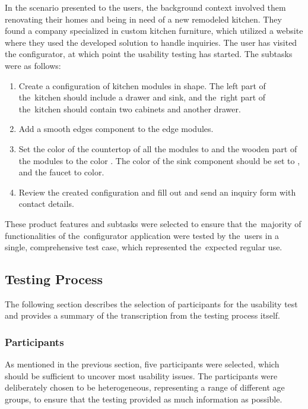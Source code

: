 In the scenario presented to the users, the background context involved them renovating their homes and being in need of a new remodeled kitchen. They found a company specialized in custom kitchen furniture, which utilized a website where they used the developed solution to handle inquiries. The user has visited the configurator, at which point the usability testing has started. The subtasks were as follows:
\begin{enumerate}
    \item Create a configuration of kitchen modules in  shape. The left part of the~kitchen should include a drawer and sink, and the~right part of the~kitchen should contain two cabinets and another drawer.
    \item Add a smooth edges component to the edge modules.
    \item Set the color of the countertop of all the modules to  and the wooden part of the modules to the color . The color of the sink component should be set to , and the faucet to  color.
    \item Review the created configuration and fill out and send an inquiry form with contact details.
\end{enumerate}

These product features and subtasks were selected to ensure that the~majority of functionalities of the~configurator application were tested by the~users in a single, comprehensive test case, which represented the~expected regular use. 


\subsection{Testing Process}

The following section describes the selection of participants for the usability test and provides a summary of the transcription from the testing process itself. 


\subsubsection{Participants}

As mentioned in the previous section, five participants were selected, which should be sufficient to uncover most usability issues. The participants were deliberately chosen to be heterogeneous, representing a range of different age groups, to ensure that the testing provided as much information as possible.

